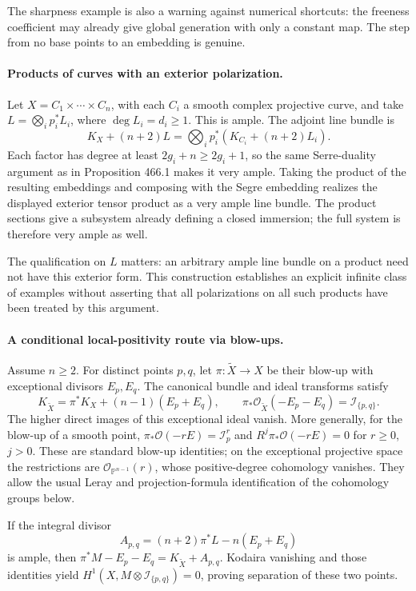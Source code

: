 \documentclass[11pt]{article}
\begin{document}
The sharpness example is also a warning against numerical shortcuts:
the freeness coefficient may already give global generation with only
a constant map. The step from no base points to an embedding is genuine.

\paragraph{Products of curves with an exterior polarization.}
Let $X=C_1\times\cdots\times C_n$, with each $C_i$ a smooth complex
projective curve, and take
$L=\bigotimes_i p_i^*L_i$, where $\deg L_i=d_i\geq1$.
This is ample. The adjoint line bundle is
\[
 K_X+(n+2)L
   =\bigotimes_i p_i^*(K_{C_i}+(n+2)L_i).
\]
Each factor has degree at least $2g_i+n\geq2g_i+1$, so the same
Serre-duality argument as in Proposition 466.1 makes it very ample.
Taking the product of the resulting embeddings and composing with
the Segre embedding realizes the displayed exterior tensor product as
a very ample line bundle. The product sections give a subsystem
already defining a closed immersion; the full system is therefore
very ample as well.

The qualification on $L$ matters: an arbitrary ample line bundle on a
product need not have this exterior form. This construction establishes
an explicit infinite class of examples without asserting that all
polarizations on all such products have been treated by this argument.

\paragraph{A conditional local-positivity route via blow-ups.}
Assume $n\geq2$. For distinct points $p,q$, let
$\pi:\widetilde X\to X$ be their blow-up with exceptional divisors
$E_p,E_q$. The canonical bundle and ideal transforms satisfy
\[
 K_{\widetilde X}=\pi^*K_X+(n-1)(E_p+E_q),\qquad
 \pi_*\mathcal O_{\widetilde X}(-E_p-E_q)=\mathcal I_{\{p,q\}}.
\]
The higher direct images of this exceptional ideal vanish. More
generally, for the blow-up of a smooth point,
$\pi_*\mathcal O(-rE)=\mathcal I_p^r$ and
$R^j\pi_*\mathcal O(-rE)=0$ for $r\geq0$, $j>0$.
These are standard blow-up identities; on the exceptional projective
space the restrictions are $\mathcal O_{\mathbb P^{n-1}}(r)$,
whose positive-degree cohomology vanishes. They allow the usual Leray
and projection-formula identification of the cohomology groups below.

If the integral divisor
\[
 A_{p,q}=(n+2)\pi^*L-n(E_p+E_q)
 \tag{466.3}
\]
is ample, then
$\pi^*M-E_p-E_q=K_{\widetilde X}+A_{p,q}$.
Kodaira vanishing and those identities yield
$H^1(X,M\otimes\mathcal I_{\{p,q\}})=0$, proving separation of
these two points.
\end{document}
